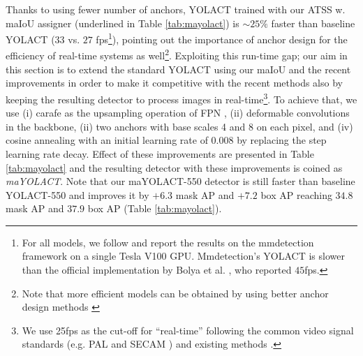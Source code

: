 \documentclass{bmvc2k}
\begin{document}
Thanks to using fewer number of anchors, YOLACT trained with our ATSS w. maIoU assigner (underlined in Table \ref{tab:mayolact}) is $\sim 25 \%$ faster than baseline YOLACT ($33$ vs. $27$ fps\footnote{For all models, we follow and report the results on the  mmdetection framework \cite{mmdetection} on a single Tesla V100 GPU. Mmdetection's YOLACT is slower than the official implementation by Bolya et al. \cite{yolact}, who reported $45$fps.}), pointing out the importance of anchor design for the efficiency of real-time systems as well\footnote{Note that more efficient models can be obtained by using better anchor design methods \cite{MetaAnchor,AdaptiveAnchor1,AdaptiveAnchor3,AdaptiveAnchor2}}. Exploiting this run-time gap; our aim in this section is to extend the standard YOLACT using our maIoU and the recent improvements in order to make it competitive with the recent methods also by keeping the resulting detector to process images in real-time\footnote{We use 25fps as the cut-off for ``real-time'' following the common video signal standards (e.g. PAL \cite{pal} and SECAM \cite{secam}) and existing methods \cite{bpd, salientod, basnet, tinieryolo}.}. To achieve that, we use (i) carafe \cite{carafe} as the upsampling operation of FPN \cite{FeaturePyramidNetwork}, (ii) deformable convolutions \cite{DCNv2} in the backbone, (ii) two anchors with base scales 4 and 8 on each pixel, and (iv) cosine annealing  with an initial learning rate of $0.008$ by replacing the step learning rate decay. Effect of these improvements are presented in Table \ref{tab:mayolact} and the resulting detector with these improvements is coined as \textit{maYOLACT}. Note that our maYOLACT-550 detector is still faster than baseline YOLACT-550 and improves it by $+6.3$ mask AP and $+7.2$ box AP reaching $34.8$ mask AP and $37.9$ box AP (Table \ref{tab:mayolact}). 
\end{document}
